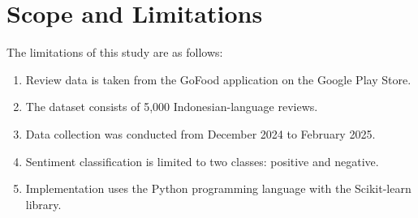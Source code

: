 \section{Scope and Limitations}

The limitations of this study are as follows:

\begin{enumerate}
  \item Review data is taken from the GoFood application on the Google Play Store.
  \item The dataset consists of 5,000 Indonesian-language reviews.
  \item Data collection was conducted from December 2024 to February 2025.
  \item Sentiment classification is limited to two classes: positive and negative.
  \item Implementation uses the Python programming language with the Scikit-learn library.
\end{enumerate}
